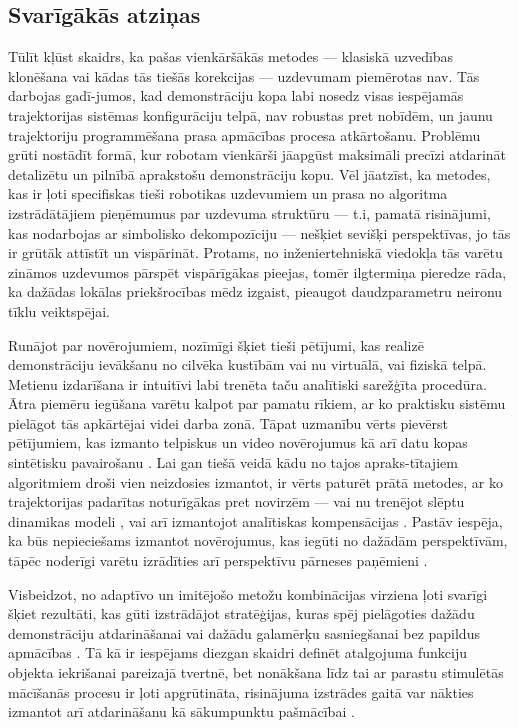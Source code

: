 \documentclass[12pt, a4paper]{article}
\numberwithin{equation}{section} %
\begin{document}
\subsection{Svarīgākās atziņas}

Tūlīt kļūst skaidrs, ka pašas vienkāršākās metodes --- klasiskā uzvedības klonēšana \cite{pomerleau1989alvinn} vai kādas tās tiešās korekcijas --- uzdevumam piemērotas nav. Tās darbojas gadī-jumos, kad demonstrāciju kopa labi nosedz visas iespējamās trajektorijas sistēmas konfigurāciju telpā, nav robustas pret nobīdēm, un jaunu trajektoriju programmēšana prasa apmācības procesa atkārtošanu. Problēmu grūti nostādīt formā, kur robotam vienkārši jāapgūst maksimāli precīzi atdarināt detalizētu un pilnībā aprakstošu demonstrāciju kopu. Vēl jāatzīst, ka metodes, kas ir ļoti specifiskas tieši robotikas uzdevumiem un prasa no algoritma izstrādātājiem pieņēmumus par uzdevuma struktūru --- t.i, pamatā risinājumi, kas nodarbojas ar simbolisko dekompozīciju \cite{ijspeert2002movement,schaal2003computational, wang2020framework,pastor2011online,pastor2011skill} --- nešķiet sevišķi perspektīvas, jo tās ir grūtāk attīstīt un vispārināt. Protams, no inženiertehniskā viedokļa tās varētu zināmos uzdevumos pārspēt vispārīgākas pieejas, tomēr ilgtermiņa pieredze rāda, ka dažādas lokālas priekšrocības mēdz izgaist, pieaugot daudzparametru neironu tīklu veiktspējai.

Runājot par novērojumiem, nozīmīgi šķiet tieši pētījumi, kas realizē demonstrāciju ievākšanu no cilvēka kustībām \cite{jha2017imitation,zhang2018deep} vai nu virtuālā, vai fiziskā telpā. Metienu izdarīšana ir intuitīvi labi trenēta taču analītiski sarežģīta procedūra. Ātra piemēru iegūšana varētu kalpot par pamatu rīkiem, ar ko praktisku sistēmu pielāgot tās apkārtējai videi darba zonā. Tāpat uzmanību vērts pievērst pētījumiem, kas izmanto telpiskus un video novērojumus kā arī datu kopas sintētisku pavairošanu \cite{dyrstad2018teaching}. Lai gan tiešā veidā kādu no tajos apraks-tītajiem algoritmiem droši vien neizdosies izmantot, ir vērts paturēt prātā metodes, ar ko trajektorijas padarītas noturīgākas pret novirzēm --- vai nu trenējot slēptu dinamikas modeli \cite{torabi2018behavioral}, vai arī izmantojot analītiskas kompensācijas \cite{pastor2011online}. Pastāv iespēja, ka būs nepieciešams izmantot novērojumus, kas iegūti no dažādām perspektīvām, tāpēc noderīgi varētu izrādīties arī perspektīvu pārneses paņēmieni \cite{liu2018imitation}.

Visbeidzot, no adaptīvo un imitējošo metožu kombinācijas virziena ļoti svarīgi šķiet rezultāti, kas gūti izstrādājot stratēģijas, kuras spēj pielāgoties dažādu demonstrāciju atdarināšanai \cite{duan2017one} vai dažādu galamērķu sasniegšanai bez papildus apmācības \cite{lynch2020learning,lynch2021language,gupta2019relay}. Tā kā ir iespējams diezgan skaidri definēt atalgojuma funkciju objekta iekrišanai pareizajā tvertnē, bet nonākšana līdz tai ar parastu stimulētās mācīšanās procesu ir ļoti apgrūtināta, risinājuma izstrādes gaitā var nākties izmantot arī atdarināšanu kā sākumpunktu pašmācībai \cite{hester2018deep}. 
\end{document}
